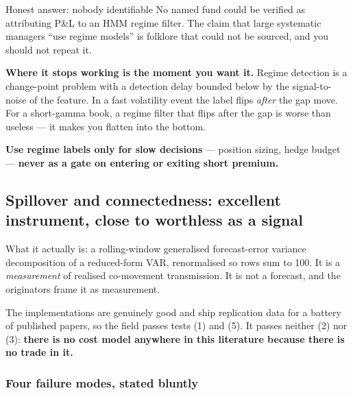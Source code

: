 \documentclass[11pt,a4paper]{article}
\begin{document}
\begin{keyfact}{Honest answer: nobody identifiable}
No named fund could be verified as attributing P\&L to an HMM regime filter. The
claim that large systematic managers ``use regime models'' is folklore that could
not be sourced, and you should not repeat it.
\end{keyfact}

\textbf{Where it stops working is the moment you want it.} Regime detection is a
change-point problem with a detection delay bounded below by the signal-to-noise of
the feature. In a fast volatility event the label flips \emph{after} the gap move.
For a short-gamma book, a regime filter that flips after the gap is worse than
useless --- it makes you flatten into the bottom.

\textbf{Use regime labels only for slow decisions} --- position sizing, hedge
budget --- \textbf{never as a gate on entering or exiting short premium.}

\subsection{Spillover and connectedness: excellent instrument, close to worthless as a signal}

What it actually is: a rolling-window generalised forecast-error variance
decomposition of a reduced-form VAR, renormalised so rows sum to 100. It is a
\emph{measurement} of realised co-movement transmission. It is not a forecast, and
the originators frame it as measurement.

The implementations are genuinely good and ship replication data for a battery of
published papers, so the field passes tests (1) and (5). It passes neither (2) nor
(3): \textbf{there is no cost model anywhere in this literature because there is no
trade in it.}

\subsubsection{Four failure modes, stated bluntly}
\end{document}
